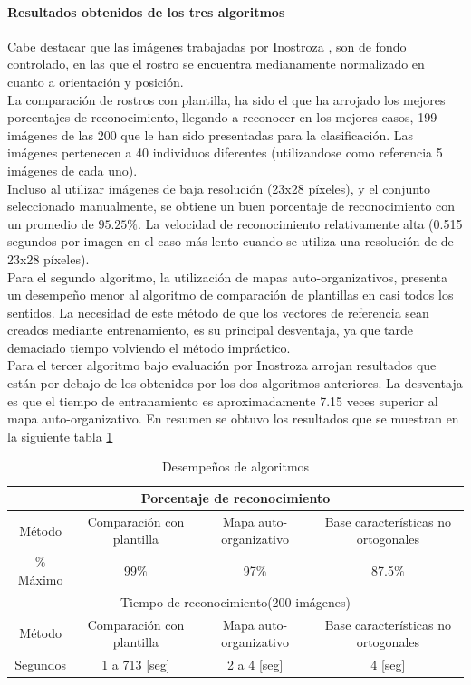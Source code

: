 \documentclass[letterpaper,12pt]{article}
\begin{document}
\paragraph{Resultados obtenidos de los tres algoritmos}

Cabe destacar que las imágenes trabajadas por Inostroza  \cite{ElectronicoUdeC}, son de fondo controlado, en las que el rostro se encuentra medianamente normalizado en cuanto a orientación y posición.\\
La comparación de rostros con plantilla, ha sido el que ha arrojado los mejores porcentajes de reconocimiento, llegando a reconocer en los mejores casos, 199 imágenes de las 200 que le han sido presentadas para la clasificación. Las imágenes pertenecen a 40 individuos diferentes (utilizandose como referencia 5 imágenes de cada uno).\\
Incluso al utilizar imágenes de baja resolución (23x28 píxeles), y el conjunto seleccionado manualmente, se obtiene un buen porcentaje de reconocimiento con un promedio de $95.25\%$. La velocidad de reconocimiento relativamente alta (0.515 segundos por imagen en el caso más lento cuando se utiliza una resolución de de 23x28 píxeles).\\
Para el segundo algoritmo, la utilización de mapas auto-organizativos, presenta un desempeño menor al algoritmo de comparación de plantillas en casi todos los sentidos. La necesidad de este método de que los vectores de referencia sean creados mediante entrenamiento, es su principal desventaja, ya que tarde demaciado tiempo volviendo el método impráctico.\\
Para el tercer algoritmo bajo evaluación por Inostroza \cite{ElectronicoUdeC} arrojan resultados que están por debajo de los obtenidos por los dos algoritmos anteriores. La desventaja es que el tiempo de entranamiento es aproximadamente 7.15 veces superior al mapa auto-organizativo. En resumen se obtuvo los resultados que se muestran en la siguiente tabla \ref{TablaInostroza}

\begin{table}[H]
\begin{tabular}{|c|c|c|c|}
\hline 
\multicolumn{4}{|c|}{Porcentaje de reconocimiento} \\ 
\hline 
Método&Comparación con plantilla&Mapa auto-organizativo&Base características no ortogonales\\ 
\hline 
$\%$Máximo& 99$\%$ & 97$\%$& 87.5$\%$ \\ 
\hline 
\multicolumn{4}{|c|}{Tiempo de reconocimiento(200 imágenes)} \\ 
\hline 
Método&Comparación con plantilla&Mapa auto-organizativo&Base características no ortogonales\\ 
\hline 
Segundos& 1 a 713 [seg] & 2 a 4 [seg]& 4 [seg] \\ 
\hline 
\end{tabular}
\caption{Desempeños de algoritmos}
\label{TablaInostroza} 
\end{table}
\newpage
\end{document}
